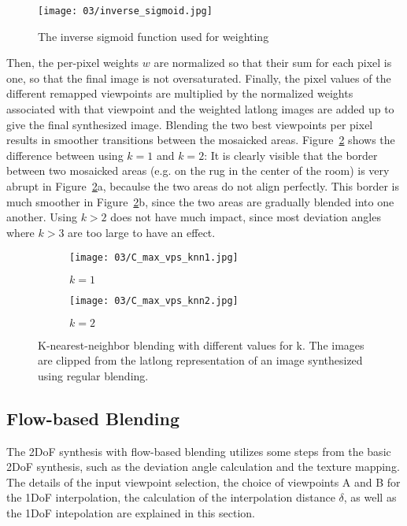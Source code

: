 \begin{figure}
		\centering
		\texttt{[image: 03/inverse\_sigmoid.jpg]}
		\caption{The inverse sigmoid function used for weighting}
		\label{fig:sigmoid}
\end{figure}

Then, the per-pixel weights $w$ are normalized so that their sum for each pixel is one, so that the final image is not oversaturated. Finally, the pixel values of the different remapped viewpoints are multiplied by the normalized weights associated with that viewpoint and the weighted latlong images are added up to give the final synthesized image. Blending the two best viewpoints per pixel results in smoother transitions between the mosaicked areas. Figure~\ref{fig:knn} shows the difference between using $k=1$ and $k=2$: It is clearly visible that the border between two mosaicked areas (e.g. on the rug in the center of the room) is very abrupt in Figure~\ref{fig:knn}a, becaulse the two areas do not align perfectly. This border is much smoother in Figure~\ref{fig:knn}b, since the two areas are gradually blended into one another. Using $k>2$ does not have much impact, since most deviation angles where $k>3$ are too large to have an effect.

\begin{figure}
\centering
    \hfill
    \begin{subfigure}[t]{0.5\textwidth}
            \centering
            \texttt{[image: 03/C\_max\_vps\_knn1.jpg]}
            \caption{$k=1$}
    \end{subfigure}%
    \hfill
    \begin{subfigure}[t]{0.5\textwidth}
            \centering
            \texttt{[image: 03/C\_max\_vps\_knn2.jpg]}
            \caption{$k=2$}
    \end{subfigure}
    \hfill
  \caption[K-nearest-neighbor blending with different values for k]{K-nearest-neighbor blending with different values for k. The images are clipped from the latlong representation of an image synthesized using regular blending.} \label{fig:knn}
\end{figure}

\subsection{Flow-based Blending}
The 2DoF synthesis with flow-based blending utilizes some steps from the basic 2DoF synthesis, such as the deviation angle calculation and the texture mapping. The details of the input viewpoint selection, the choice of viewpoints A and B for the 1DoF interpolation, the calculation of the interpolation distance $\delta$, as well as the 1DoF intepolation are explained in this section. 

